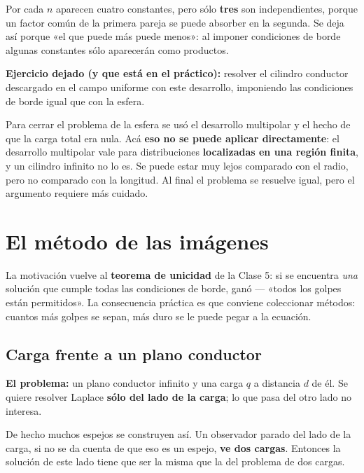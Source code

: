 \documentclass[12pt,a4paper]{article}
\begin{document}
\begin{notebox}
Por cada $n$ aparecen cuatro constantes, pero sólo \textbf{tres} son
independientes, porque un factor común de la primera pareja se puede absorber en
la segunda. Se deja así porque «el que puede más puede menos»: al imponer
condiciones de borde algunas constantes sólo aparecerán como productos.
\end{notebox}

\textbf{Ejercicio dejado (y que está en el práctico):} resolver el cilindro
conductor descargado en el campo uniforme con este desarrollo, imponiendo las
condiciones de borde igual que con la esfera.

\begin{warnbox}
Para cerrar el problema de la esfera se usó el desarrollo multipolar y el hecho de
que la carga total era nula. Acá \textbf{eso no se puede aplicar directamente}: el
desarrollo multipolar vale para distribuciones \textbf{localizadas en una región
finita}, y un cilindro infinito no lo es. Se puede estar muy lejos comparado con
el radio, pero no comparado con la longitud. Al final el problema se resuelve
igual, pero el argumento requiere más cuidado.
\end{warnbox}

\section{El método de las imágenes}

La motivación vuelve al \textbf{teorema de unicidad} de la Clase 5: si se
encuentra \emph{una} solución que cumple todas las condiciones de borde, ganó ---
«todos los golpes están permitidos». La consecuencia práctica es que conviene
coleccionar métodos: cuantos más golpes se sepan, más duro se le puede pegar a la
ecuación.

\subsection{Carga frente a un plano conductor}

\textbf{El problema:} un plano conductor infinito y una carga $q$ a distancia $d$
de él. Se quiere resolver Laplace \textbf{sólo del lado de la carga}; lo que pasa
del otro lado no interesa.

\begin{keybox}
De hecho muchos espejos se construyen así. Un observador parado del lado de la
carga, si no se da cuenta de que eso es un espejo, \textbf{ve dos cargas}.
Entonces la solución de este lado tiene que ser la misma que la del problema de dos
cargas.
\end{keybox}
\end{document}
